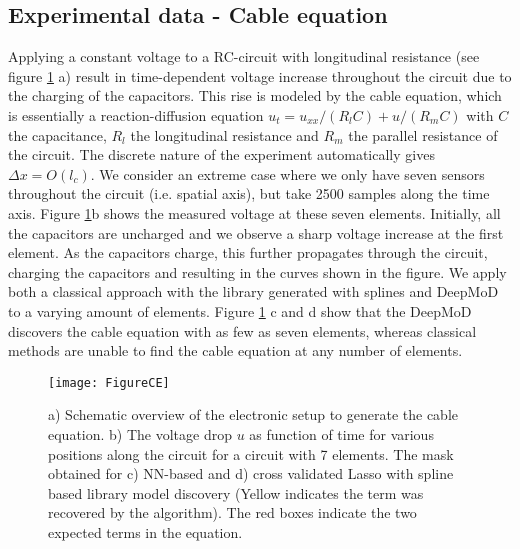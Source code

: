 \documentclass{article} %
\begin{document}
\subsection{Experimental data - Cable equation}
 Applying a constant voltage to a RC-circuit with longitudinal resistance (see figure \ref{figure:CE} a) result in time-dependent voltage increase throughout the circuit due to the charging of the capacitors. This rise is modeled by the cable equation, which is essentially a reaction-diffusion equation $ u_t =  u_{xx}/ (R_l C) + u/(R_m C)$ with $C$ the capacitance, $R_l$ the longitudinal resistance and $R_m$ the parallel resistance of the circuit. The discrete nature of the experiment automatically gives $\Delta x = O(l_c)$. We consider an extreme case where we only have seven sensors throughout the circuit (i.e. spatial axis), but take 2500 samples along the time axis. Figure \ref{figure:CE}b shows the measured voltage at these seven elements. Initially, all the capacitors are uncharged and we observe a sharp voltage increase at the first element. As the capacitors charge, this further propagates through the circuit, charging the capacitors and resulting in the curves shown in the figure. We apply both a classical approach with the library generated with splines and DeepMoD to a varying amount of elements. Figure \ref{figure:CE} c and d show that the DeepMoD discovers the cable equation with as few as seven elements, whereas classical methods are unable to find the cable equation at any number of elements. 

\begin{figure}
\centering
    \texttt{[image: FigureCE]}
    \caption{a) Schematic overview of the electronic setup to generate the cable equation. b) The voltage drop $u$ as function of time for various positions along the circuit for a circuit with 7 elements. The mask obtained for c) NN-based and d) cross validated Lasso with spline based library model discovery (Yellow indicates the term was recovered by the algorithm). The red boxes indicate the two expected terms in the equation.}
    \label{figure:CE}
\end{figure}
\end{document}
